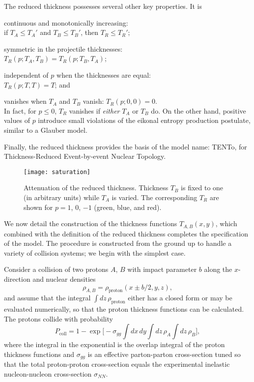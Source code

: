 \documentclass[aps,prc,reprint,amsmath,nofootinbib]{revtex4-1}
\newcommand{\trento}{T\raisebox{-.5ex}{R}ENTo}
\begin{document}
The reduced thickness possesses several other key properties.  It is
\begin{enumerate*}
  \renewcommand{\labelenumi}{(\alph{enumi})}
  \item continuous and monotonically increasing: \\
    if $T_A \leq T_A'$ and $T_B \leq T_B'$, then $T_R \leq T_R'$;
  \item symmetric in the projectile thicknesses: \\
    $T_R(p; T_A, T_B) = T_R(p; T_B, T_A)$;
  \item independent of $p$ when the thicknesses are equal: \\
    $T_R(p; T, T) = T$; and
  \item vanishes when $T_A$ and $T_B$ vanish: $T_R(p; 0, 0) = 0$. \\
    In fact, for $p \leq 0$, $T_R$ vanishes if \emph{either} $T_A$ or $T_B$ do.
    On the other hand, positive values of $p$ introduce small violations of the eikonal entropy production postulate, similar to a Glauber model.
\end{enumerate*}

Finally, the reduced thickness provides the basis of the model name:
\trento, for Thickness-Reduced Event-by-event Nuclear Topology.

\begin{figure}[t]
  \texttt{[image: saturation]}
  \caption{
    \label{fig:saturation}
    Attenuation of the reduced thickness.  Thickness $T_B$ is fixed to one (in arbitrary units) while $T_A$ is
    varied.  The corresponding $T_R$ are shown for $p = 1$, 0, $-1$ (green, blue, and red).
  }
\end{figure}

We now detail the construction of the thickness functions $T_{A,B}(x, y)$, which combined with the definition
of the reduced thickness completes the specification of the model.  The procedure is constructed from the
ground up to handle a variety of collision systems; we begin with the simplest case.

Consider a collision of two protons $A$, $B$ with impact parameter $b$ along the $x$-direction and nuclear densities
\begin{equation}
  \rho_{A,B} = \rho_\text{proton}(x \pm b/2, y, z),
\end{equation}
and assume that the integral $\int dz \, \rho_\text{proton}$ either has a closed form or may be evaluated numerically, so that the proton thickness functions can be calculated.
The protons collide with probability \cite{dEnterria:2010hd}
\begin{equation}
  P_\text{coll} = 1 - \exp\biggl[ -\sigma_{gg} \int dx \, dy \int dz \, \rho_A \int dz \, \rho_B \biggr],
  \label{eq:pcoll}
\end{equation}
where the integral in the exponential is the overlap integral of the proton thickness functions and
$\sigma_{gg}$ is an effective parton-parton cross-section tuned so that the total proton-proton
cross-section equals the experimental inelastic nucleon-nucleon cross-section $\sigma_{NN}$.
\end{document}
